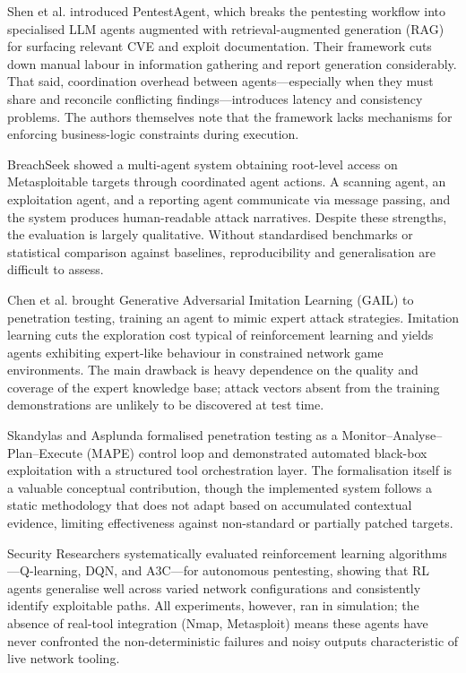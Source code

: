 \documentclass[conference]{IEEEtran}
\begin{document}
Shen et al. \cite{shen2024pentestagent} introduced PentestAgent, which breaks the pentesting workflow into specialised LLM agents augmented with retrieval-augmented generation (RAG) for surfacing relevant CVE and exploit documentation. Their framework cuts down manual labour in information gathering and report generation considerably. That said, coordination overhead between agents---especially when they must share and reconcile conflicting findings---introduces latency and consistency problems. The authors themselves note that the framework lacks mechanisms for enforcing business-logic constraints during execution.

BreachSeek \cite{breachseek2024} showed a multi-agent system obtaining root-level access on Metasploitable targets through coordinated agent actions. A scanning agent, an exploitation agent, and a reporting agent communicate via message passing, and the system produces human-readable attack narratives. Despite these strengths, the evaluation is largely qualitative. Without standardised benchmarks or statistical comparison against baselines, reproducibility and generalisation are difficult to assess.

Chen et al. \cite{chen2023gailpt} brought Generative Adversarial Imitation Learning (GAIL) to penetration testing, training an agent to mimic expert attack strategies. Imitation learning cuts the exploration cost typical of reinforcement learning and yields agents exhibiting expert-like behaviour in constrained network game environments. The main drawback is heavy dependence on the quality and coverage of the expert knowledge base; attack vectors absent from the training demonstrations are unlikely to be discovered at test time.

Skandylas and Asplunda \cite{skandylas2024autopentest} formalised penetration testing as a Monitor--Analyse--Plan--Execute (MAPE) control loop and demonstrated automated black-box exploitation with a structured tool orchestration layer. The formalisation itself is a valuable conceptual contribution, though the implemented system follows a static methodology that does not adapt based on accumulated contextual evidence, limiting effectiveness against non-standard or partially patched targets.

Security Researchers \cite{rl2024pentest} systematically evaluated reinforcement learning algorithms---Q-learning, DQN, and A3C---for autonomous pentesting, showing that RL agents generalise well across varied network configurations and consistently identify exploitable paths. All experiments, however, ran in simulation; the absence of real-tool integration (Nmap, Metasploit) means these agents have never confronted the non-deterministic failures and noisy outputs characteristic of live network tooling.
\end{document}
